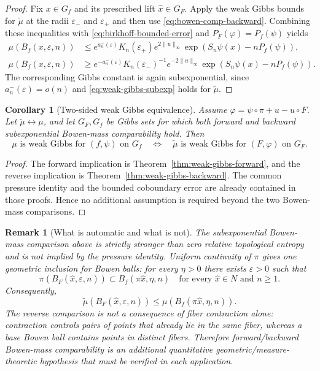 \documentclass[11pt,a4paper]{article}
\newtheorem{corollary}[theorem]{Corollary}
\newtheorem{remark}[theorem]{Remark}
\newcommand{\eps}{\varepsilon}
\begin{document}
\begin{proof}
Fix $x\in G_f$ and its prescribed lift $\hat x\in G_F$. Apply the weak
Gibbs bounds for $\widetilde\mu$ at the radii $\eps_-$ and $\eps_+$ and
then use \eqref{eq:bowen-comp-backward}. Combining these inequalities with
\eqref{eq:birkhoff-bounded-error} and
$P_F(\varphi)=P_f(\psi)$ yields
\begin{align*}
\mu(B_f(x,\eps,n))
&\le e^{a_n^-(\eps)}K_n(\eps_+)e^{2\|u\|_\infty}
\exp(S_n\psi(x)-nP_f(\psi)),\\
\mu(B_f(x,\eps,n))
&\ge e^{-a_n^-(\eps)}K_n(\eps_-)^{-1}e^{-2\|u\|_\infty}
\exp(S_n\psi(x)-nP_f(\psi)).
\end{align*}
The corresponding Gibbs constant is again subexponential, since
$a_n^-(\eps)=o(n)$ and \eqref{eq:weak-gibbs-subexp} holds for
$\widetilde\mu$.
\end{proof}

\begin{corollary}[Two-sided weak Gibbs equivalence]
\label{thm:weak-gibbs}
Assume $\varphi=\psi\circ\pi+u-u\circ F$. Let
$\widetilde\mu\leftrightarrow\mu$, and let $G_F,G_f$ be Gibbs sets for
which both forward and backward subexponential Bowen-mass comparability
hold. Then
\[
\mu\text{ is weak Gibbs for }(f,\psi)\text{ on }G_f
\quad\Longleftrightarrow\quad
\widetilde\mu\text{ is weak Gibbs for }(F,\varphi)\text{ on }G_F.
\]
\end{corollary}

\begin{proof}
The forward implication is Theorem~\ref{thm:weak-gibbs-forward}, and the
reverse implication is Theorem~\ref{thm:weak-gibbs-backward}. The common
pressure identity and the bounded coboundary error are already contained in
those proofs. Hence no additional assumption is required beyond the two
Bowen-mass comparisons.
\end{proof}

\begin{remark}[What is automatic and what is not]
\label{rem:bowen-comparison-not-automatic}
The subexponential Bowen-mass comparison above is strictly stronger than
zero relative topological entropy and is not implied by the pressure
identity. Uniform continuity of $\pi$ gives one geometric inclusion for
Bowen balls: for every $\eta>0$ there exists $\eps>0$ such that
\[
\pi(B_F(\hat x,\eps,n))\subset B_f(\pi\hat x,\eta,n)
\quad\text{for every }\hat x\in N\text{ and }n\ge1.
\]
Consequently,
\[
\widetilde\mu(B_F(\hat x,\eps,n))
\le \mu(B_f(\pi\hat x,\eta,n)).
\]
The reverse comparison is not a consequence of fiber contraction alone:
contraction controls pairs of points that already lie in the same fiber,
whereas a base Bowen ball contains points in distinct fibers. Therefore
forward/backward Bowen-mass comparability is an additional quantitative
geometric/measure-theoretic hypothesis that must be verified in each
application.
\end{remark}
\end{document}
